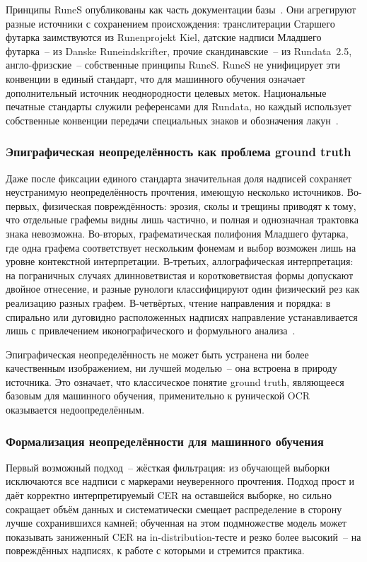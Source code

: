 \documentclass[a4paper,12pt]{extarticle}
\begin{document}
Принципы RuneS опубликованы как часть документации базы~\cite{runesdb}. Они агрегируют разные источники с сохранением происхождения: транслитерации Старшего футарка заимствуются из Runenprojekt Kiel, датские надписи Младшего футарка~-- из Danske Runeindskrifter, прочие скандинавские~-- из Rundata~2.5, англо-фризские~-- собственные принципы RuneS. RuneS не унифицирует эти конвенции в единый стандарт, что для машинного обучения означает дополнительный источник неоднородности целевых меток. Национальные печатные стандарты служили референсами для Rundata, но каждый использует собственные конвенции передачи специальных знаков и обозначения лакун~\cite{williams2022}.

\subsubsection{Эпиграфическая неопределённость как проблема ground truth}

Даже после фиксации единого стандарта значительная доля надписей сохраняет неустранимую неопределённость прочтения, имеющую несколько источников. Во-первых, физическая повреждённость: эрозия, сколы и трещины приводят к тому, что отдельные графемы видны лишь частично, и полная и однозначная трактовка знака невозможна. Во-вторых, графематическая полифония Младшего футарка, где одна графема соответствует нескольким фонемам и выбор возможен лишь на уровне контекстной интерпретации. В-третьих, аллографическая интерпретация: на пограничных случаях длинноветвистая и коротковетвистая формы допускают двойное отнесение, и разные рунологи классифицируют один физический рез как реализацию разных графем. В-четвёртых, чтение направления и порядка: в спирально или дуговидно расположенных надписях направление устанавливается лишь с привлечением иконографического и формульного анализа~\cite{kallstrom2007,williams2010}.

Эпиграфическая неопределённость не может быть устранена ни более качественным изображением, ни лучшей моделью~-- она встроена в природу источника. Это означает, что классическое понятие ground truth, являющееся базовым для машинного обучения, применительно к рунической OCR оказывается недоопределённым.

\subsubsection{Формализация неопределённости для машинного обучения}

Первый возможный подход~-- жёсткая фильтрация: из обучающей выборки исключаются все надписи с маркерами неуверенного прочтения. Подход прост и даёт корректно интерпретируемый CER на оставшейся выборке, но сильно сокращает объём данных и систематически смещает распределение в сторону лучше сохранившихся камней; обученная на этом подмножестве модель может показывать заниженный CER на in-distribution-тесте и резко более высокий~-- на повреждённых надписях, к работе с которыми и стремится практика.
\end{document}
